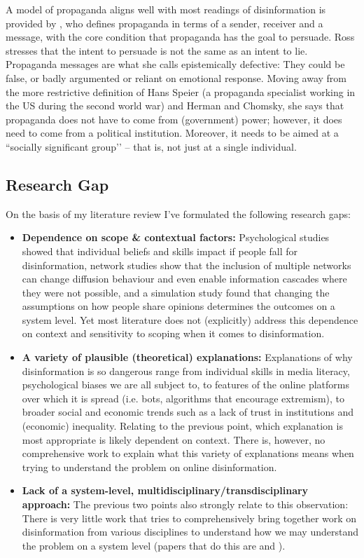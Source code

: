 \documentclass[10pt,a4paper]{article}
\begin{document}
A model of propaganda aligns well with most readings of disinformation is provided by \cite{ ross2002understanding}, who defines propaganda in terms of a sender, receiver and a message, with the core condition that propaganda has the goal to persuade. Ross stresses that the intent to persuade is not the same as an intent to lie. Propaganda messages are what she calls epistemically defective: They could be false, or badly argumented or reliant on emotional response. Moving away from the more restrictive definition of Hans Speier (a propaganda specialist working in the US during the second world war) and Herman and Chomsky, she says that propaganda does not have to come from (government) power; however, it does need to come from a political institution. Moreover, it needs to be aimed at a ``socially significant group’’ – that is, not just at a single individual. \\




\subsection{Research Gap}
On the basis of my literature review I've formulated the following research gaps:
\begin{itemize}
	\item \textbf{Dependence on scope \& contextual factors:} Psychological studies showed that individual beliefs and skills impact if people fall for disinformation, network studies show that the inclusion of multiple networks can change diffusion behaviour and even enable information cascades where they were not possible, and a simulation study found that changing the assumptions on how people share opinions determines the outcomes on a system level. Yet most literature does not (explicitly) address this dependence on context and sensitivity to scoping when it comes to disinformation. 
	\item \textbf{A variety of plausible (theoretical) explanations:} Explanations of why disinformation is so dangerous range from individual skills in media literacy, psychological biases we are all subject to, to features of the online platforms over which it is spread (i.e. bots, algorithms that encourage extremism), to broader social and economic trends such as a lack of trust in institutions and (economic) inequality. Relating to the previous point, which explanation is most appropriate is likely dependent on context. There is, however, no comprehensive work to explain what this variety of explanations means when trying to understand the problem on online disinformation.
	\item \textbf{Lack of a system-level, multidisciplinary/transdisciplinary approach:} The previous two points also strongly relate to this observation: There is very little work that tries to comprehensively bring together work on disinformation from various disciplines to understand how we may understand the problem on a system level (papers that do this are \cite{lewandowsky2017beyond} and \cite{Starbird2019}).
\end{itemize}
\end{document}
